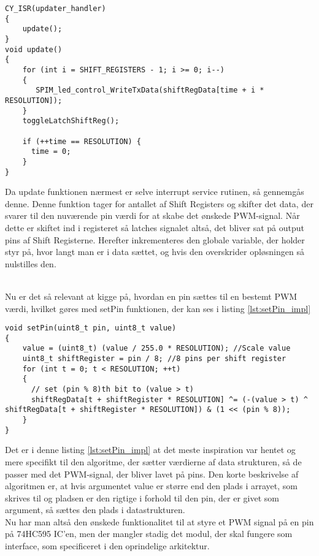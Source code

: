 \documentclass[Softwaredesign/Softwaredesign_main.tex]{subfiles}
\begin{document}
\begin{lstlisting}[caption={ISR & Update}, label={lst:ISR_Update_impl}]
CY_ISR(updater_handler)
{
    update();
}                   
void update()
{
    for (int i = SHIFT_REGISTERS - 1; i >= 0; i--)
    {
       SPIM_led_control_WriteTxData(shiftRegData[time + i * RESOLUTION]);
    }
    toggleLatchShiftReg();
    
    if (++time == RESOLUTION) {
      time = 0;
    }
}
\end{lstlisting}

Da update funktionen nærmest er selve interrupt service rutinen, så gennemgås denne. Denne funktion tager for antallet af Shift Registers og skifter det data, der svarer til den nuværende pin værdi for at skabe det ønskede PWM-signal. Når dette er skiftet ind i registeret så latches signalet altså, det bliver sat på output pins af Shift Registerne. Herefter inkrementeres den globale variable, der holder styr på, hvor langt man er i data sættet, og hvis den overskrider opløsningen så nulstilles den.

\\Nu er det så relevant at kigge på, hvordan en pin sættes til en bestemt PWM værdi, hvilket gøres med setPin funktionen, der kan ses i listing \ref{lst:setPin_impl}

\begin{lstlisting}[caption={Implementeringen af setPin}, label={lst:setPin_impl}]
void setPin(uint8_t pin, uint8_t value)
{
    value = (uint8_t) (value / 255.0 * RESOLUTION); //Scale value
    uint8_t shiftRegister = pin / 8; //8 pins per shift register
    for (int t = 0; t < RESOLUTION; ++t)
    {
      // set (pin % 8)th bit to (value > t)
      shiftRegData[t + shiftRegister * RESOLUTION] ^= (-(value > t) ^ shiftRegData[t + shiftRegister * RESOLUTION]) & (1 << (pin % 8));
    }
}
\end{lstlisting}

Det er i denne listing \ref{lst:setPin_impl} at det meste inspiration var hentet og mere specifikt til den algoritme, der sætter værdierne af data strukturen, så de passer med det PWM-signal, der bliver lavet på pins. Den korte beskrivelse af algoritmen er, at hvis argumentet value er større end den plads i arrayet, som skrives til og pladsen er den rigtige i forhold til den pin, der er givet som argument, så sættes den plads i datastrukturen. 
\\Nu har man altså den ønskede funktionalitet til at styre et PWM signal på en pin på 74HC595 IC'en, men der mangler stadig det modul, der skal fungere som interface, som specificeret i den oprindelige arkitektur.
\end{document}

